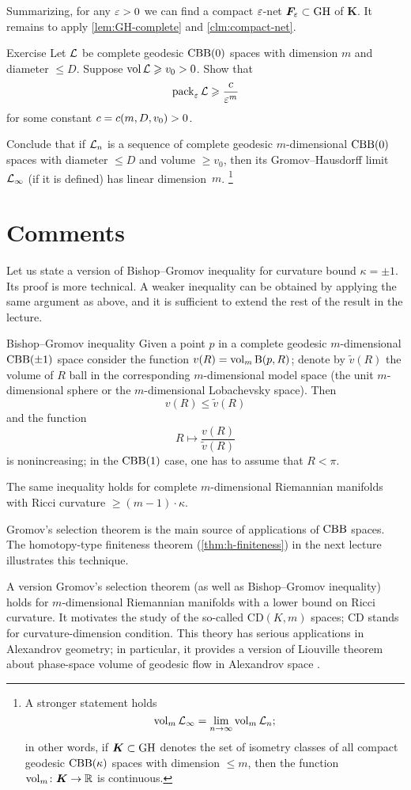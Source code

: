 Summarizing, for any $\varepsilon>0$ we can find a compact $\varepsilon$-net $\bm{F}_\varepsilon\subset \operatorname{\rm GH}\nolimits$ of $\bm{K}$.
It remains to apply \ref{lem:GH-complete} and \ref{clm:compact-net}.
\qeds

\begin{thm}{Exercise}\label{ex:pack-vol}
Let $\mathcal{L}$ be complete geodesic $\mathrm{CBB}(0)$ spaces with dimension $m$ and diameter $\le D$.
Suppose $\operatorname{\rm vol}\nolimits\mathcal{L}\geqslant v_0>0$.
Show that 
\[\operatorname{\rm pack}\nolimits_\varepsilon\mathcal{L}\geqslant \frac{c}{\varepsilon^m}\]
for some constant $c=c(m,D,v_0)>0$.

Conclude that if $\mathcal{L}_n$ is a sequence of complete geodesic $m$-dimensional $\mathrm{CBB}(0)$ spaces with diameter $\le D$ and volume $\ge v_0$, then its Gromov--Hausdorff limit $\mathcal{L}_\infty$ (if it is defined) has linear dimension~$m$.%
\footnote{A stronger statement holds 
\[\operatorname{\rm vol}\nolimits_m\mathcal{L}_\infty=\lim_{n\to\infty} \operatorname{\rm vol}\nolimits_m\mathcal{L}_n;\]
in other words, if $\bm{K}\subset \operatorname{\rm GH}\nolimits$ denotes the set of isometry classes of all compact geodesic $\mathrm{CBB}(\kappa)$ spaces with dimension $\le m$, then the function
$\operatorname{\rm vol}\nolimits_m\colon\bm{K}\to \mathbb{R}$ is continuous.}
\end{thm}

\section{Comments}

Let us state a version of Bishop--Gromov inequality for curvature bound $\kappa=\pm1$.
Its proof is more technical.
A weaker inequality can be obtained by applying the same argument as above,
and it is sufficient to extend the rest of the result in the lecture.

\begin{thm}{Bishop--Gromov inequality}
Given a point $p$ in a complete geodesic $m$-dimensional $\mathrm{CBB}(\pm1)$ space consider the function $v(R)\z=\vol_m\oBall(p,R)$;
denote by $\tilde v(R)$ the volume of $R$ ball in the corresponding $m$-dimensional model space (the unit $m$-dimensional sphere or the $m$-dimensional Lobachevsky space).
Then 
\[v(R)\le \tilde v(R)\]
and the function 
\[R\mapsto \frac{v(R)}{\tilde v(R)}\] is nonincreasing;
in the $\mathrm{CBB}(1)$ case, one has to assume that $R<\pi$.
\end{thm}

The same inequality holds for complete $m$-dimensional Riemannian manifolds with Ricci curvature $\ge (m-1)\cdot \kappa$.

Gromov's selection theorem is the main source of applications of $\mathrm{CBB}$ spaces.
The homotopy-type finiteness theorem (\ref{thm:h-finiteness}) in the next lecture illustrates this technique.

A version Gromov's selection theorem (as well as Bishop--Gromov inequality) holds for $m$-dimensional Riemannian manifolds with a lower bound on Ricci curvature.
It motivates the study of the so-called $\mathrm{CD}(K,m)$ spaces; $\mathrm{CD}$ stands for curvature-dimension condition.
This theory has serious applications in Alexandrov geometry;
in particular, it provides a version of Liouville theorem about phase-space volume of geodesic flow in Alexandrov space \cite{brue-mondino-semola}.

